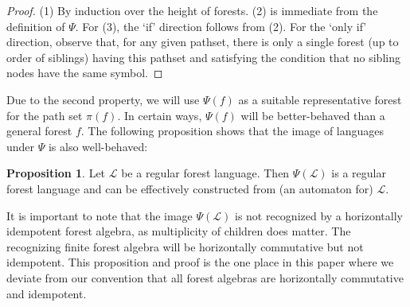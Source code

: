 \documentclass[sigplan,9pt]{acmart}\settopmatter{printfolios=true,printccs=false,printacmref=false}
\newcounter{thm}
\newcounter{theorem}
\theoremstyle{definition}
\newtheorem{prop}[thm]{Proposition}
\newcommand{\La}[0]{{\mathcal{L}}}
\begin{document}
\begin{proof}
(1) By induction over the height of forests.
(2) is immediate from the definition of $\Psi$.
For (3), the `if' direction follows from (2). For the `only if' direction, observe that, for any given pathset, there is only a single forest (up to order of siblings) having this pathset and satisfying the condition that no sibling nodes have the same symbol.
\end{proof}

Due to the second property, we will use $\Psi(f)$ as a suitable representative forest for the path set $\pi(f)$.
In certain ways, $\Psi(f)$ will be better-behaved than a general forest $f$.
The following proposition shows that the image of languages under $\Psi$ is also well-behaved:

\begin{prop}\label{prop:psi-reg}
Let $\La$ be a regular forest language. Then $\Psi(\La)$ is a regular forest language and can be effectively constructed from (an automaton for) $\La$.
\end{prop}

It is important to note that the image $\Psi(\La)$ is not recognized by a horizontally idempotent forest algebra, as multiplicity of children does matter. The recognizing finite forest algebra will be horizontally commutative but not idempotent.
This proposition and proof is the one place in this paper where we deviate from our convention that all forest algebras are horizontally commutative and idempotent.
\end{document}
